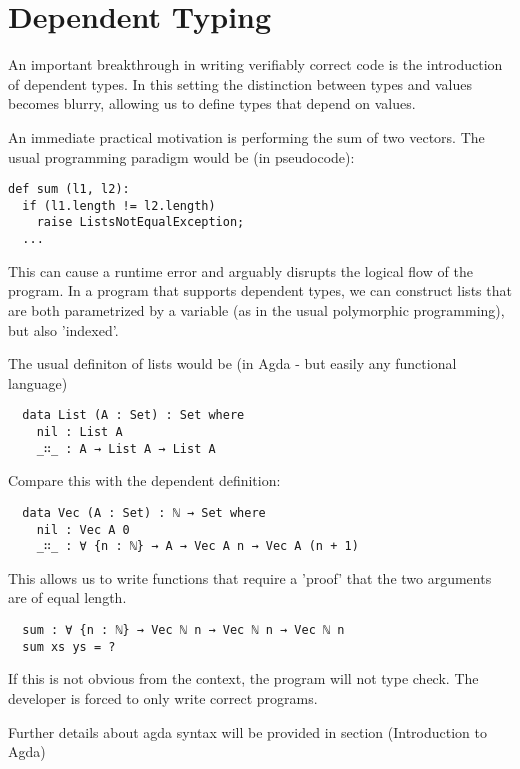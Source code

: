 \documentclass[12pt,twoside,notitlepage]{report}
\begin{document}
\section{Dependent Typing}

An important breakthrough in writing verifiably correct code is the introduction of dependent types.\cite{achipala}
In this setting the distinction between types and values becomes blurry, allowing us to define types that depend on values.


An immediate practical motivation is performing the sum of two vectors.
The usual programming paradigm would be (in pseudocode): \\

\begin{verbatim}
def sum (l1, l2):
  if (l1.length != l2.length)
    raise ListsNotEqualException;
  ...
\end{verbatim}

This can cause a runtime error and arguably disrupts the logical flow of the program. In a program that
supports dependent types, we can construct lists that are both parametrized by a variable (as in the usual
polymorphic programming), but also 'indexed'.

The usual definiton of lists would be (in Agda - but easily any functional language)

\begin{verbatim}
  data List (A : Set) : Set where
    nil : List A
    _∷_ : A → List A → List A
 \end{verbatim}

Compare this with the dependent definition:

\begin{verbatim}
  data Vec (A : Set) : ℕ → Set where
    nil : Vec A 0
    _∷_ : ∀ {n : ℕ} → A → Vec A n → Vec A (n + 1)
\end{verbatim}

This allows us to write functions that require a 'proof' that the two arguments are of equal length.

\begin{verbatim}
  sum : ∀ {n : ℕ} → Vec ℕ n → Vec ℕ n → Vec ℕ n
  sum xs ys = ?
\end{verbatim}

If this is not obvious from the context, the program will not type check.
The developer is forced to only write correct programs.

Further details about agda syntax will be provided in section (Introduction to Agda)
\end{document}

